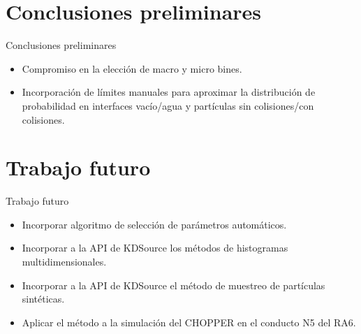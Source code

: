 \documentclass[aspectratio=169,english]{beamer}
\begin{document}
    


\section{Conclusiones preliminares}
\begin{frame}{Conclusiones preliminares}
    \begin{itemize}
        \item Compromiso en la elección de macro y micro bines.\\
        \item Incorporación de límites manuales para aproximar la distribución de probabilidad en interfaces vacío/agua y partículas sin colisiones/con colisiones.\\
    
    \end{itemize}

\end{frame}

\section{Trabajo futuro}
\begin{frame}{Trabajo futuro}

    \begin{itemize}
        \item Incorporar algoritmo de selección de parámetros automáticos.\\
        \item Incorporar a la API de KDSource los métodos de histogramas multidimensionales.\\
        \item Incorporar a la API de KDSource el método de muestreo de partículas sintéticas. \\
        \item Aplicar el método a la simulación del CHOPPER en el conducto N5 del RA6. \\
    \end{itemize}


\end{frame}
\end{document}
